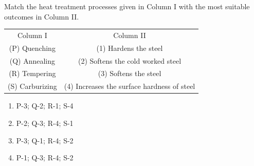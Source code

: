     \item Match the heat treatment processes given in Column I with the most suitable outcomes in Column II. \\
    \begin{tabular}{c c}
        
        Column I & Column II \\
        
        (P) Quenching & (1) Hardens the steel \\
        (Q) Annealing & (2) Softens the cold worked steel \\
        (R) Tempering & (3) Softens the steel \\
        (S) Carburizing & (4) Increases the surface hardness of steel \\
        
    \end{tabular}
    
    \begin{enumerate}
        \item P-3; Q-2; R-1; S-4
        \item P-2; Q-3; R-4; S-1
        \item P-3; Q-1; R-4; S-2 
        \item P-1; Q-3; R-4; S-2
    \end{enumerate}

